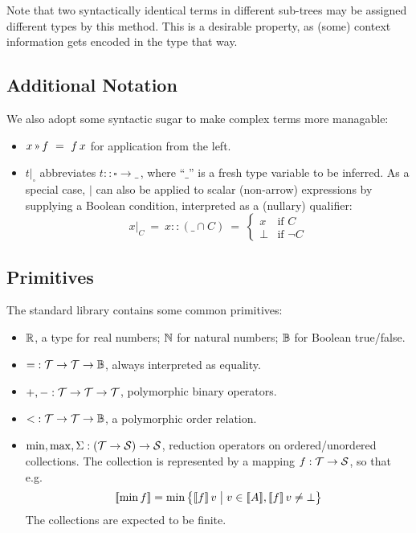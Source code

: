 Note that two syntactically identical terms in different sub-trees may be assigned
different types by this method. This is a desirable property, as (some) context information
gets encoded in the type that way.

\subsection{Additional Notation}
\newcommand\applt{\textrm{{\scriptsize\,}\guillemotright{\scriptsize\,}}}

We also adopt some syntactic sugar to make complex terms more managable:

\begin{itemize}
  \item $x \applt f ~=~ f\,x$ for application from the left.
  \item $t\big|_{\square}$ abbreviates $t::\square\to\_\,$, where ``$\_$'' is a fresh type variable
    to be inferred. As a special case, $\big|$ can also be applied
    to scalar (non-arrow) expressions by supplying a Boolean condition,
    interpreted as a (nullary) qualifier:
    \[x\big|_{C} ~=~ x :: (\_\cap C) ~=~ \begin{cases}x & \mbox{if }C \\ \bot & \mbox{if }\lnot C\end{cases}\]
\end{itemize}

\subsection{Primitives}

The standard library contains some common primitives:

\begin{itemize}
  \item $\mathbb{R}$, a type for real numbers; $\mathbb{N}$ for natural numbers; $\mathbb{B}$ for Boolean true/false.
  \item ${=} : \mathcal{T}\to\mathcal{T}\to\mathbb{B}$, always interpreted as equality.
  \item ${+}, {-} : \mathcal{T}\to\mathcal{T}\to\mathcal{T}$, polymorphic binary operators.
  \item ${<} : \mathcal{T}\to\mathcal{T}\to\mathbb{B}$, a polymorphic order relation.
  \item $\min, \max, \Sigma : (\mathcal{T}\to\mathcal{S})\to\mathcal{S}$, reduction operators
    on ordered/unordered collections. The collection is represented by a mapping $f : \mathcal{T}\to\mathcal{S}$,
    so that e.g. \[\semp{\min f} = \min \big\{\semp{f}\,v \;\big|\; v\in\semp{A}, \semp{f}\,v\neq\bot\big\}\]
    The collections are expected to be finite.
\end{itemize}

